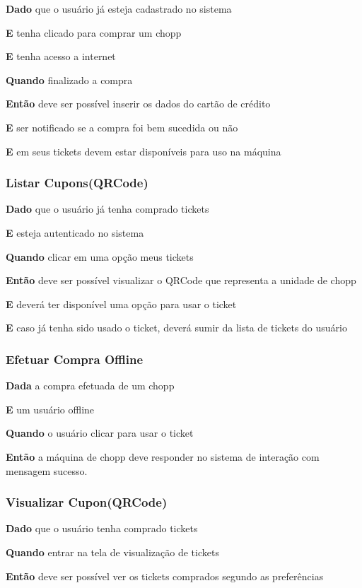 \textbf{Dado} que o usuário já esteja cadastrado no sistema

\textbf{E} tenha clicado para comprar um chopp

\textbf{E} tenha acesso a internet

\textbf{Quando} finalizado a compra

\textbf{Então} deve ser possível inserir os dados do cartão de crédito

\textbf{E} ser notificado se a compra foi bem sucedida ou não

\textbf{E} em seus tickets devem estar disponíveis para uso na máquina

\subsubsection{Listar Cupons(QRCode)}

\textbf{Dado} que o usuário já tenha comprado tickets

\textbf{E} esteja autenticado no sistema

\textbf{Quando} clicar em uma opção meus tickets

\textbf{Então} deve ser possível  visualizar o QRCode que representa a unidade de chopp

\textbf{E} deverá ter disponível uma opção para usar o ticket

\textbf{E} caso já tenha sido usado o ticket, deverá sumir da lista de tickets do usuário

\subsubsection{Efetuar Compra Offline}

\textbf{Dada} a compra efetuada de um chopp

\textbf{E} um usuário offline

\textbf{Quando} o usuário clicar para usar o ticket

\textbf{Então} a máquina de chopp deve responder no sistema de interação com mensagem sucesso.

\subsubsection{Visualizar Cupon(QRCode)}

\textbf{Dado} que o usuário tenha comprado tickets

\textbf{Quando} entrar na tela de visualização de tickets

\textbf{Então} deve ser possível ver os tickets comprados segundo as preferências

